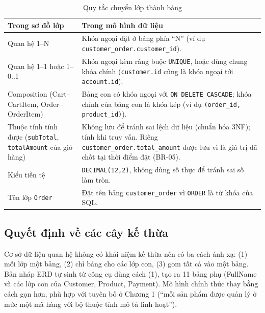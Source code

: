 \documentclass[12pt,a4paper,oneside]{report}
\begin{document}
\begin{longtable}{p{4.6cm}p{11.2cm}}
\caption{Quy tắc chuyển lớp thành bảng}\\
\toprule
\textbf{Trong sơ đồ lớp} & \textbf{Trong mô hình dữ liệu} \\
\midrule
\endhead
\bottomrule
\endlastfoot
Quan hệ 1--N & Khóa ngoại đặt ở bảng phía ``N'' (ví dụ \texttt{customer\_order.customer\_id}). \\
Quan hệ 1--1 hoặc 1--0..1 & Khóa ngoại kèm ràng buộc \texttt{UNIQUE}, hoặc dùng chung khóa chính (\texttt{customer.id} cũng là khóa ngoại tới \texttt{account.id}). \\
Composition (Cart--CartItem, Order--OrderItem) & Bảng con có khóa ngoại với \texttt{ON DELETE CASCADE}; khóa chính của bảng con là khóa kép (ví dụ \texttt{(order\_id, product\_id)}). \\
Thuộc tính tính được (\texttt{subTotal}, \texttt{totalAmount} của giỏ hàng) & Không lưu để tránh sai lệch dữ liệu (chuẩn hóa 3NF); tính khi truy vấn. Riêng \texttt{customer\_order.total\_amount} được lưu vì là giá trị đã chốt tại thời điểm đặt (BR-05). \\
Kiểu tiền tệ & \texttt{DECIMAL(12,2)}, không dùng số thực để tránh sai số làm tròn. \\
Tên lớp \texttt{Order} & Đặt tên bảng \texttt{customer\_order} vì \texttt{ORDER} là từ khóa của SQL. \\
\end{longtable}

\subsection{Quyết định về các cây kế thừa}

Cơ sở dữ liệu quan hệ không có khái niệm kế thừa nên có ba cách ánh xạ: (1) mỗi lớp một bảng, (2) chỉ bảng cho các lớp con, (3) gom tất cả vào một bảng. Bản nháp ERD tự sinh từ công cụ dùng cách (1), tạo ra 11 bảng phụ (FullName và các lớp con của Customer, Product, Payment). Mô hình chính thức thay bằng cách gọn hơn, phù hợp với tuyên bố ở Chương 1 (``mỗi sản phẩm được quản lý ở mức một mã hàng với bộ thuộc tính mô tả linh hoạt'').
\end{document}

